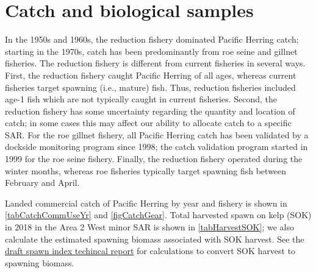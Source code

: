 \documentclass[12pt]{article}\usepackage[]{graphicx}\usepackage[]{color}
\newcommand{\regionName}{Area 2 West}
\newcommand{\regionType}{minor}
\newcommand{\thisYr}{2018}
\newcommand{\fishName}{Pacific Herring}
\newcommand{\spawnIndexTechReport}{See the \href{https://github.com/grinnellm/HerringSpawnDocumentation/blob/master/SpawnIndexTechnicalReport.pdf}{draft spawn index techincal report} for calculations to convert SOK harvest to spawning biomass.}
\begin{document}



\section{Catch and biological samples}

In the 1950s and 1960s, the reduction fishery dominated \fishName{} catch; starting in the 1970s, catch has been predominantly from roe seine and gillnet fisheries.
The reduction fishery is different from current fisheries in several ways.
First, the reduction fishery caught \fishName{} of all ages, whereas current fisheries target spawning (i.e., mature) fish.
Thus, reduction fisheries included age-1 fish which are not typically caught in current fisheries.
Second, the reduction fishery has some uncertainty regarding the quantity and location of catch; in some cases this may affect our ability to allocate catch to a specific SAR.
For the roe gillnet fishery, all \fishName{} catch has been validated by a dockside monitoring program since 1998; the catch validation program started in 1999 for the roe seine fishery.
Finally, the reduction fishery operated during the winter months, whereas roe fisheries typically target spawning fish between February and April.

Landed commercial catch of \fishName{} by year and fishery is shown in \autoref{tabCatchCommUseYr} and \autoref{figCatchGear}.
\iftoggle{catchStatArea}{In addition to annual catch variability, catch varies among Statistical Areas (\autoref{figCatchStatArea}).}{\unskip}
Total harvested spawn on kelp (SOK) in \thisYr{} in the \regionName{} \regionType{} SAR is shown in \autoref{tabHarvestSOK}; we also calculate the estimated spawning biomass associated with SOK harvest.
\spawnIndexTechReport{}
\end{document}
